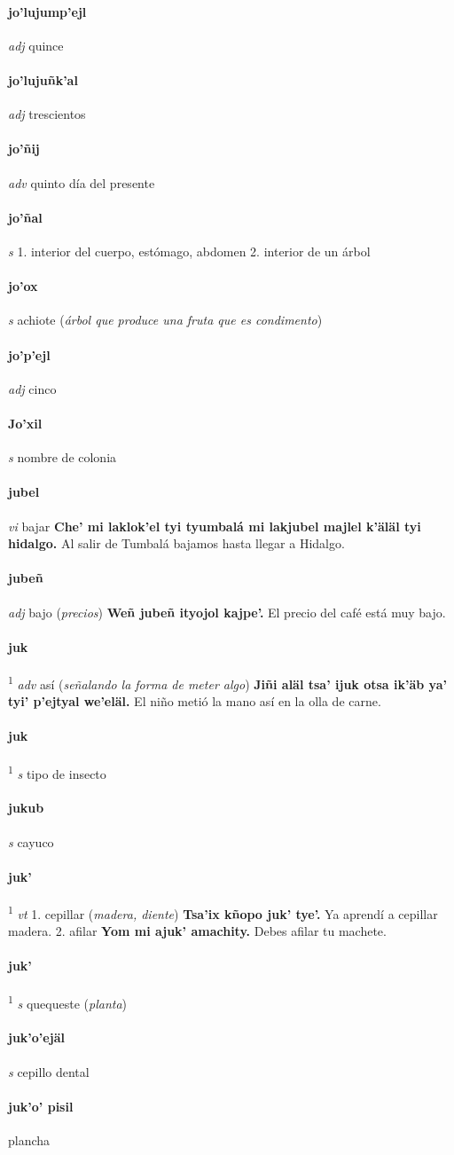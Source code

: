 \documentclass{scrbook}
\newcommand{\entry}[1]{\paragraph{#1}}
\newcommand{\onedefinition}[1]{#1.}
\newcommand{\defsuperscript}[1]{\textsuperscript{1}}
\newcommand{\partofspeech}[1]{\textit{#1}}
\newcommand{\spanishtranslation}[1]{#1}
\newcommand{\clarification}[1]{(\textit{#1})}
\newcommand{\cholexample}[1]{\textbf{#1}}
\newcommand{\exampletranslation}[1]{#1}
\begin{document}
\begin{multicols}{2}
\entry{jo'lujump'ejl}
\partofspeech{adj}
\spanishtranslation{quince}

\entry{jo'lujuñk'al}
\partofspeech{adj}
\spanishtranslation{trescientos}

\entry{jo'ñij}
\partofspeech{adv}
\spanishtranslation{quinto día del presente}

\entry{jo'ñal}
\partofspeech{s}
\onedefinition{1}
\spanishtranslation{interior del cuerpo, estómago, abdomen}
\onedefinition{2}
\spanishtranslation{interior de un árbol}

\entry{jo'ox}
\partofspeech{s}
\spanishtranslation{achiote}
\clarification{árbol que produce una fruta que es condimento}

\entry{jo'p'ejl}
\partofspeech{adj}
\spanishtranslation{cinco}

\entry{Jo'xil}
\partofspeech{s}
\spanishtranslation{nombre de colonia}

\entry{jubel}
\partofspeech{vi}
\spanishtranslation{bajar}
\cholexample{Che' mi laklok'el tyi tyumbalá mi lakjubel majlel k'äläl tyi hidalgo.}
\exampletranslation{Al salir de Tumbalá bajamos hasta llegar a Hidalgo.}

\entry{jubeñ}
\partofspeech{adj}
\spanishtranslation{bajo}
\clarification{precios}
\cholexample{Weñ jubeñ ityojol kajpe'.}
\exampletranslation{El precio del café está muy bajo.}

\entry{juk}
\defsuperscript{1}
\partofspeech{adv}
\spanishtranslation{así}
\clarification{señalando la forma de meter algo}
\cholexample{Jiñi aläl tsa' ijuk otsa ik'äb ya' tyi' p'ejtyal we'eläl.}
\exampletranslation{El niño metió la mano así en la olla de carne.}

\entry{juk}
\defsuperscript{2}
\partofspeech{s}
\spanishtranslation{tipo de insecto}

\entry{jukub}
\partofspeech{s}
\spanishtranslation{cayuco}

\entry{juk'}
\defsuperscript{1}
\partofspeech{vt}
\onedefinition{1}
\spanishtranslation{cepillar}
\clarification{madera, diente}
\cholexample{Tsa'ix kñopo juk' tye'.}
\exampletranslation{Ya aprendí a cepillar madera.}
\onedefinition{2}
\spanishtranslation{afilar}
\cholexample{Yom mi ajuk' amachity.}
\exampletranslation{Debes afilar tu machete.}

\entry{juk'}
\defsuperscript{2}
\partofspeech{s}
\spanishtranslation{quequeste}
\clarification{planta}

\entry{juk'o'ejäl}
\partofspeech{s}
\spanishtranslation{cepillo dental}

\entry{juk'o' pisil}
\spanishtranslation{plancha}


\end{multicols}
\end{document}
